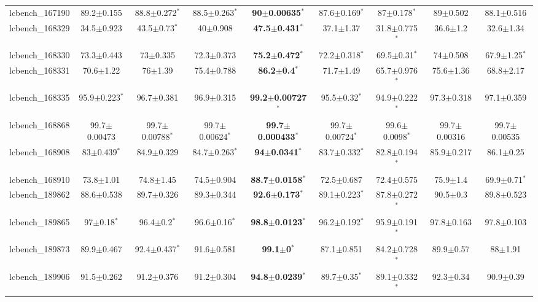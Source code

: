 \begin{table}[t]
\begin{center}
\begin{tabular}{lcccccccc}
lcbench\_167190 & 89.2$\pm$0.155 & 88.8$\pm$0.272$^{*}$ & 88.5$\pm$0.263$^{*}$ & \textbf{90$\pm$0.00635}$^{*}$ & 87.6$\pm$0.169$^{*}$ & 87$\pm$0.178$^{*}$ & 89$\pm$0.502 & 88.1$\pm$0.516 \\
lcbench\_168329 & 34.5$\pm$0.923 & 43.5$\pm$0.73$^{*}$ & 40$\pm$0.908 & \textbf{47.5$\pm$0.431}$^{*}$ & 37.1$\pm$1.37 & 31.8$\pm$0.775$^{*}$ & 36.6$\pm$1.2 & 32.6$\pm$1.34 \\
lcbench\_168330 & 73.3$\pm$0.443 & 73$\pm$0.335 & 72.3$\pm$0.373 & \textbf{75.2$\pm$0.472}$^{*}$ & 72.2$\pm$0.318$^{*}$ & 69.5$\pm$0.31$^{*}$ & 74$\pm$0.508 & 67.9$\pm$1.25$^{*}$ \\
lcbench\_168331 & 70.6$\pm$1.22 & 76$\pm$1.39 & 75.4$\pm$0.788 & \textbf{86.2$\pm$0.4}$^{*}$ & 71.7$\pm$1.49 & 65.7$\pm$0.976$^{*}$ & 75.6$\pm$1.36 & 68.8$\pm$2.17 \\
lcbench\_168335 & 95.9$\pm$0.223$^{*}$ & 96.7$\pm$0.381 & 96.9$\pm$0.315 & \textbf{99.2$\pm$0.00727}$^{*}$ & 95.5$\pm$0.32$^{*}$ & 94.9$\pm$0.222$^{*}$ & 97.3$\pm$0.318 & 97.1$\pm$0.359 \\
lcbench\_168868 & 99.7$\pm$0.00473 & 99.7$\pm$0.00788$^{*}$ & 99.7$\pm$0.00624$^{*}$ & \textbf{99.7$\pm$0.000433}$^{*}$ & 99.7$\pm$0.00724$^{*}$ & 99.6$\pm$0.0098$^{*}$ & 99.7$\pm$0.00316 & 99.7$\pm$0.00535 \\
lcbench\_168908 & 83$\pm$0.439$^{*}$ & 84.9$\pm$0.329 & 84.7$\pm$0.263$^{*}$ & \textbf{94$\pm$0.0341}$^{*}$ & 83.7$\pm$0.332$^{*}$ & 82.8$\pm$0.194$^{*}$ & 85.9$\pm$0.217 & 86.1$\pm$0.25 \\
lcbench\_168910 & 73.8$\pm$1.01 & 74.8$\pm$1.45 & 74.5$\pm$0.904 & \textbf{88.7$\pm$0.0158}$^{*}$ & 72.5$\pm$0.687 & 72.4$\pm$0.575 & 75.9$\pm$1.4 & 69.9$\pm$0.71$^{*}$ \\
lcbench\_189862 & 88.6$\pm$0.538 & 89.7$\pm$0.326 & 89.3$\pm$0.344 & \textbf{92.6$\pm$0.173}$^{*}$ & 89.1$\pm$0.223$^{*}$ & 87.8$\pm$0.272$^{*}$ & 90.5$\pm$0.3 & 89.8$\pm$0.523 \\
lcbench\_189865 & 97$\pm$0.18$^{*}$ & 96.4$\pm$0.2$^{*}$ & 96.6$\pm$0.16$^{*}$ & \textbf{98.8$\pm$0.0123}$^{*}$ & 96.2$\pm$0.192$^{*}$ & 95.9$\pm$0.191$^{*}$ & 97.8$\pm$0.163 & 97.8$\pm$0.103 \\
lcbench\_189873 & 89.9$\pm$0.467 & 92.4$\pm$0.437$^{*}$ & 91.6$\pm$0.581 & \textbf{99.1$\pm$0}$^{*}$ & 87.1$\pm$0.851 & 84.2$\pm$0.728$^{*}$ & 89.9$\pm$0.57 & 88$\pm$1.91 \\
lcbench\_189906 & 91.5$\pm$0.262 & 91.2$\pm$0.376 & 91.2$\pm$0.304 & \textbf{94.8$\pm$0.0239}$^{*}$ & 89.7$\pm$0.35$^{*}$ & 89.1$\pm$0.332$^{*}$ & 92.3$\pm$0.34 & 90.9$\pm$0.39 \\

\end{tabular}
\end{center}
\end{table}
